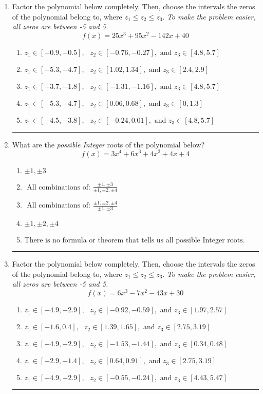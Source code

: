 \documentclass[14pt]{extbook}
\newcommand{\litem}[1]{\item#1\hspace*{-1cm}\rule{\textwidth}{0.4pt}}
\begin{document}
\begin{enumerate}
\litem{
Factor the polynomial below completely. Then, choose the intervals the zeros of the polynomial belong to, where $z_1 \leq z_2 \leq z_3$. \textit{To make the problem easier, all zeros are between -5 and 5.}\[ f(x) = 25x^{3} +95 x^{2} -142 x + 40 \]\begin{enumerate}[label=\Alph*.]
\item \( z_1 \in [-0.9, -0.5], \text{   }  z_2 \in [-0.76, -0.27], \text{   and   } z_3 \in [4.8, 5.7] \)
\item \( z_1 \in [-5.3, -4.7], \text{   }  z_2 \in [1.02, 1.34], \text{   and   } z_3 \in [2.4, 2.9] \)
\item \( z_1 \in [-3.7, -1.8], \text{   }  z_2 \in [-1.31, -1.16], \text{   and   } z_3 \in [4.8, 5.7] \)
\item \( z_1 \in [-5.3, -4.7], \text{   }  z_2 \in [0.06, 0.68], \text{   and   } z_3 \in [0, 1.3] \)
\item \( z_1 \in [-4.5, -3.8], \text{   }  z_2 \in [-0.24, 0.01], \text{   and   } z_3 \in [4.8, 5.7] \)

\end{enumerate} }
\litem{
What are the \textit{possible Integer} roots of the polynomial below?\[ f(x) = 3x^{4} +6 x^{3} +4 x^{2} +4 x + 4 \]\begin{enumerate}[label=\Alph*.]
\item \( \pm 1,\pm 3 \)
\item \( \text{ All combinations of: }\frac{\pm 1,\pm 3}{\pm 1,\pm 2,\pm 4} \)
\item \( \text{ All combinations of: }\frac{\pm 1,\pm 2,\pm 4}{\pm 1,\pm 3} \)
\item \( \pm 1,\pm 2,\pm 4 \)
\item \( \text{There is no formula or theorem that tells us all possible Integer roots.} \)

\end{enumerate} }
\litem{
Factor the polynomial below completely. Then, choose the intervals the zeros of the polynomial belong to, where $z_1 \leq z_2 \leq z_3$. \textit{To make the problem easier, all zeros are between -5 and 5.}\[ f(x) = 6x^{3} -7 x^{2} -43 x + 30 \]\begin{enumerate}[label=\Alph*.]
\item \( z_1 \in [-4.9, -2.9], \text{   }  z_2 \in [-0.92, -0.59], \text{   and   } z_3 \in [1.97, 2.57] \)
\item \( z_1 \in [-1.6, 0.4], \text{   }  z_2 \in [1.39, 1.65], \text{   and   } z_3 \in [2.75, 3.19] \)
\item \( z_1 \in [-4.9, -2.9], \text{   }  z_2 \in [-1.53, -1.44], \text{   and   } z_3 \in [0.34, 0.48] \)
\item \( z_1 \in [-2.9, -1.4], \text{   }  z_2 \in [0.64, 0.91], \text{   and   } z_3 \in [2.75, 3.19] \)
\item \( z_1 \in [-4.9, -2.9], \text{   }  z_2 \in [-0.55, -0.24], \text{   and   } z_3 \in [4.43, 5.47] \)


\end{enumerate}}
\end{enumerate}
\end{document}
